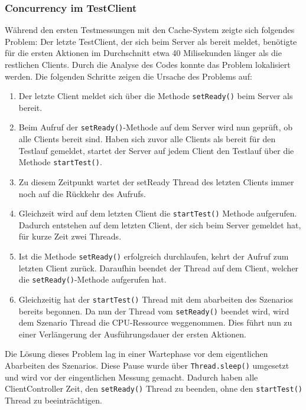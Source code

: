 \subsubsection{Concurrency im TestClient}
\label{sec:concurrencyTestClient}
Während den ersten Testmessungen mit den Cache-System zeigte sich folgendes Problem: Der letzte TestClient, der sich beim Server als bereit meldet, benötigte für die ersten Aktionen im Durchschnitt etwa 40 Milisekunden länger als die restlichen Clients. Durch die Analyse des Codes konnte das Problem lokalisiert werden. Die folgenden Schritte zeigen die Ursache des Problems auf:
\begin{enumerate}
\item Der letzte Client meldet sich über die Methode \verb+setReady()+ beim Server als bereit. 
\item Beim Aufruf der \verb+setReady()+-Methode auf dem Server wird nun ge\-prüft, ob alle Clients bereit sind. Haben sich zuvor alle Clients als bereit für den Test\-lauf ge\-meldet, startet der Server auf jedem Client den Testlauf über die Methode \verb+startTest()+.
\item Zu diesem Zeitpunkt wartet der setReady Thread des letzten Clients immer noch auf die Rückkehr des Aufrufs.
\item Gleich\-zeit wird auf dem letzten Client die \verb+startTest()+ Methode auf\-gerufen. Da\-durch ent\-stehen auf dem letzten Client, der sich beim Server gemeldet hat, für kurze Zeit zwei Threads.
\item Ist die Methode \verb+setReady()+ erfolg\-reich durch\-laufen, kehrt der Auf\-ruf zum letzten Client zu\-rück. Da\-rauf\-hin be\-endet der Thread auf dem Client, welcher die \verb+setReady()+-Methode auf\-ge\-rufen hat.
\item Gleichzeitig hat der \verb+startTest()+ Thread mit dem abarbeiten des Szenarios bereits begonnen. Da nun der Thread vom \verb+setReady()+ beendet wird, wird dem Szenario Thread die CPU-Ressource weggenommen. Dies führt nun zu einer Verlängerung der Ausführungsdauer der ersten Aktionen.
\end{enumerate}
Die Lösung dieses Problem lag in einer Wartephase vor dem eigentlichen Abarbeiten des Szenarios. Diese Pause wurde über \verb+Thread.sleep()+ um\-ge\-setzt und wird vor der eingent\-lichen Messung ge\-macht. Da\-durch haben alle Client\-Controller Zeit, den \verb+setReady()+ Th\-read zu be\-enden, ohne den \verb+startTest()+ Th\-read zu be\-ein\-träch\-ti\-gen.



